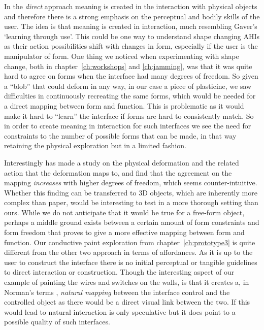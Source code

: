 In the \emph{direct} approach meaning is created in the interaction with physical objects and therefore there is a strong emphasis on the perceptual and bodily skills of the user.
The idea is that meaning is created in interaction, much resembling Gaver's `learning through use'. 
This could be one way to understand shape changing AHIs as their action possibilities shift with changes in form, especially if the user is the manipulator of form.
One thing we noticed when experimenting with shape change, both in chapter~\ref{ch:workshops} and \ref{ch:jamming}, was that it was quite hard to agree on forms when the interface had many degrees of freedom.
So given a ``blob'' that could deform in any way, in our case a piece of plasticine, we saw difficulties in continuously recreating the same forms, which would be needed for a direct mapping between form and function.
This is problematic as it would make it hard to ``learn'' the interface if forms are hard to consistently match.
So in order to create meaning in interaction for such interfaces we see the need for constraints to the number of possible forms that can be made, in that way retaining the physical exploration but in a limited fashion.

Interestingly \citet{lee2010users} has made a study on the physical deformation and the related action that the deformation maps to, and find that the agreement on the mapping \emph{increases} with higher degrees of freedom, which seems counter-intuitive.
Whether this finding can be transferred to 3D objects, which are inherently more complex than paper, would be interesting to test in a more thorough setting than ours.
While we do not anticipate that it would be true for a free-form object, perhaps a middle ground exists between a certain amount of form constraints and form freedom that proves to give a more effective mapping between form and function.
\blank
Our conductive paint exploration from chapter~\ref{ch:prototype3} is quite different from the other two approach in terms of affordances.
As it is up to the user to construct the interface there is no initial perceptual or tangible guidelines to direct interaction or construction. Though the interesting aspect of our example of painting the wires and switches on the walls, is that it creates a, in Norman's terms \citep{norman2002design}, \emph{natural mapping} between the interface control and the controlled object as there would be a direct visual link between the two.
If this would lead to natural interaction is only speculative but it does point to a possible quality of such interfaces. 

